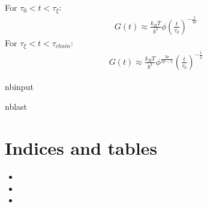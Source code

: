 \documentclass[letterpaper,10pt,english]{sphinxmanual}
\begin{document}
\sphinxAtStartPar
For \(\tau_0<t<\tau_{\xi}\):
\begin{equation*}
\begin{split}G(t)\approx \frac{k_B T}{b^3}\phi \left ( \frac{t}{\tau_0}\right )^{-\frac{1}{3\nu}}\end{split}
\end{equation*}
\sphinxAtStartPar
For \(\tau_{\xi}<t<\tau_{chain}\):
\begin{equation*}
\begin{split}G(t)\approx \frac{k_B T}{b^3}\phi^{\frac{3\nu}{3\nu-1}} \left ( \frac{t}{\tau_0}\right )^{-\frac{1}{2}}\end{split}
\end{equation*}
\begin{sphinxuseclass}{nbinput}
\begin{sphinxuseclass}{nblast}
{
\begin{sphinxVerbatim}[commandchars=\\\{\}]
\llap{\color{nbsphinxin}[ ]:\,\hspace{\fboxrule}\hspace{\fboxsep}}
\end{sphinxVerbatim}
}

\end{sphinxuseclass}
\end{sphinxuseclass}



\chapter{Indices and tables}
\label{\detokenize{index:indices-and-tables}}\begin{itemize}
\item {} 
\sphinxAtStartPar
{}

\item {} 
\sphinxAtStartPar
{}

\item {} 
\sphinxAtStartPar
{}

\end{itemize}



\renewcommand{\indexname}{Index}
\printindex
\end{document}
